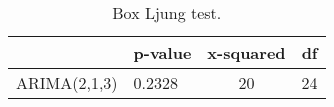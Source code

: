 \begin{table}[ht]
\centering
\caption[Box Ljung test.]{Box Ljung test.} 
\label{tab:chp_ts:arima_res_rbox_l}
\begin{tabular}{llcc}
  \toprule  & p-value & x-squared & df \\ 
  \midrule ARIMA(2,1,3)                    & 0.2328 & 20 & 24 \\ 
   \bottomrule \end{tabular}
\end{table}
